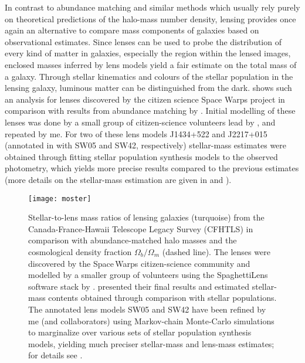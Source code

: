 In contrast to abundance matching and similar methods which usually rely purely
on theoretical predictions of the halo-mass number density, lensing provides
once again an alternative to compare mass components of galaxies based on
observational estimates.  Since lenses can be used to probe the distribution of
every kind of matter in galaxies, especially the region within the lensed
images, enclosed masses inferred by lens models yield a fair estimate on the
total mass of a galaxy. Through stellar kinematics and colours of the stellar
population in the lensing galaxy, luminous matter can be distinguished from the
dark.   shows such an analysis for lenses discovered by the
citizen science Space Warps project in comparison with results from abundance
matching by .  Initial modelling of these lenses was done
by a small group of citizen-science volunteers lead by , and
repeated by me.  For two of these lens models J1434+522 and J2217+015 (annotated
in  with SW05 and SW42, respectively) stellar-mass estimates were
obtained through fitting stellar population synthesis models to the observed
photometry, which yields more precise results compared to the previous estimates
(more details on the stellar-mass estimation are given in  and
).

\begin{figure}[h]%
    \centering%
    \texttt{[image: moster]}%
    \caption[Stellar-to-lens mass ratios of lensing galaxies]{Stellar-to-lens
        mass ratios of lensing galaxies (turquoise) from the
        Canada-France-Hawaii Telescope Legacy Survey (CFHTLS) in comparison with
        abundance-matched halo masses \cite[blue line; cf. Moster et
        al.][]{Moster12} and the cosmological density fraction
        $\Omega_{b}/\Omega_{m}$ (dashed line).  The lenses were discovered by
        the Space\,Warps citizen-science community and modelled by a smaller
        group of volunteers using the SpaghettiLens software stack by
        .   presented their final results and
        estimated stellar-mass contents obtained through comparison with stellar
        populations.  The annotated lens models SW05 and SW42 have been refined
        by me (and collaborators) using Markov-chain Monte-Carlo simulations to
        marginalize over various sets of stellar population synthesis models,
        yielding much preciser stellar-mass and lens-mass estimates; for details
        see .  }%
\end{figure}%